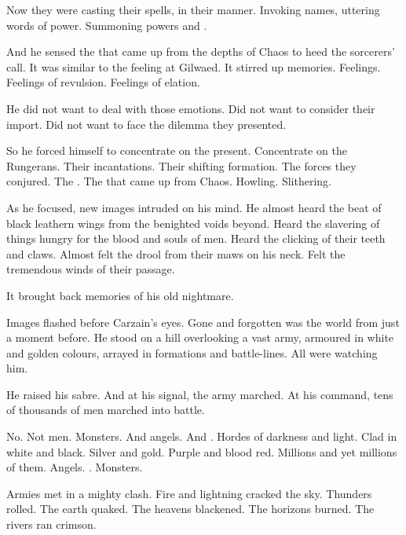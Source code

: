 Now they were casting their spells, in their \rethyactic{} manner. 
Invoking names, uttering words of power. 
Summoning \chaotic{} powers and \daemons. 

And he sensed the \daemons{} that came up from the depths of Chaos to heed the sorcerers' call. 
It was similar to the feeling at Gilwaed. 
It stirred up memories. 
Feelings. 
Feelings of revulsion. 
Feelings of elation. 

He did not want to deal with those emotions. 
Did not want to consider their import. 
Did not want to face the dilemma they presented. 

So he forced himself to concentrate on the present. 
Concentrate on the Rungerans. 
Their incantations. 
Their shifting formation. 
The forces they conjured. 
The \daemons. 
The \daemons{} that came up from Chaos. 
Howling. 
Slithering. 

As he focused, new images intruded on his mind. 
He almost heard the beat of black leathern wings from the benighted voids beyond. 
Heard the slavering of things hungry for the blood and souls of men. 
Heard the clicking of their teeth and claws. 
Almost felt the drool from their maws on his neck. 
Felt the tremendous winds of their passage. 

It brought back memories of his old nightmare. 




Images flashed before Carzain's eyes. 
Gone and forgotten was the world from just a moment before. 
He stood on a hill overlooking a vast army, armoured in white and golden colours, arrayed in formations and battle-lines. 
All were watching him. 

He raised his sabre. 
And at his signal, the army marched. 
At his command, tens of thousands of men marched into battle. 

No. 
Not men. 
Monsters. 
And angels. 
And \daemons. 
Hordes of darkness and light.  
Clad in white and black. 
Silver and gold. 
Purple and blood red. 
Millions and yet millions of them. 
Angels. 
\Dragons. 
Monsters. 

Armies met in a mighty clash. 
Fire and lightning cracked the sky. 
Thunders rolled. 
The earth quaked. 
The heavens blackened. 
The horizons burned. 
The rivers ran crimson. 

